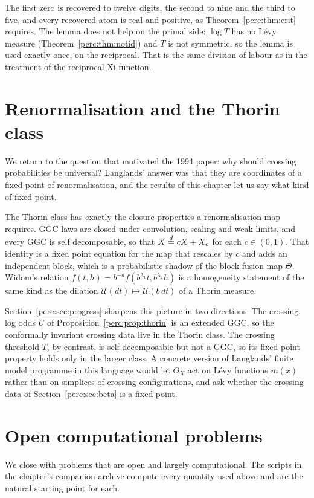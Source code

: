 The first zero is recovered to twelve digits, the second to nine and the third to five, and every recovered atom is real and positive, as Theorem~\ref{perc:thm:crit} requires. The lemma does not help on the primal side: $\log T$ has no Lévy measure (Theorem~\ref{perc:thm:notid}) and $T$ is not symmetric, so the lemma is used exactly once, on the reciprocal. That is the same division of labour as in the treatment of the reciprocal Xi function.

\section{Renormalisation and the Thorin class}

We return to the question that motivated the 1994 paper: why should crossing probabilities be universal? Langlands' answer was that they are coordinates of a fixed point of renormalisation, and the results of this chapter let us say what kind of fixed point.

The Thorin class has exactly the closure properties a renormalisation map requires. GGC laws are closed under convolution, scaling and weak limits, and every GGC is self decomposable, so that $X\overset{d}{=} cX+X_c$ for each $c\in(0,1)$. That identity is a fixed point equation for the map that rescales by $c$ and adds an independent block, which is a probabilistic shadow of the block fusion map $\Theta$. Widom's relation $f(t,h) = b^{-d}f(b^{\lambda_1}t,b^{\lambda_2}h)$ is a homogeneity statement of the same kind as the dilation $\mathcal{U}(dt)\mapsto\mathcal{U}(b\,dt)$ of a Thorin measure.

Section~\ref{perc:sec:progress} sharpens this picture in two directions. The crossing log odds $U$ of Proposition~\ref{perc:prop:thorin} is an extended GGC, so the conformally invariant crossing data live in the Thorin class. The crossing threshold $T$, by contrast, is self decomposable but not a GGC, so its fixed point property holds only in the larger class. A concrete version of Langlands' finite model programme in this language would let $\Theta_X$ act on Lévy functions $m(x)$ rather than on simplices of crossing configurations, and ask whether the crossing data of Section~\ref{perc:sec:beta} is a fixed point.

\section{Open computational problems}\label{perc:sec:problems}

We close with problems that are open and largely computational. The scripts in the chapter's companion archive compute every quantity used above and are the natural starting point for each.


